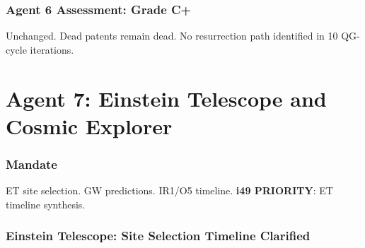 \documentclass[11pt,a4paper]{article}
\begin{document}
\section{Agent 6 Assessment: Grade C+}

Unchanged. Dead patents remain dead. No resurrection path identified in 10 QG-cycle iterations.


\part{Agent 7: Einstein Telescope and Cosmic Explorer}
\label{part:agent7}

\section{Mandate}

ET site selection. GW predictions. IR1/O5 timeline. \textbf{i49 PRIORITY}: ET timeline synthesis.

\section{Einstein Telescope: Site Selection Timeline Clarified}
\end{document}
